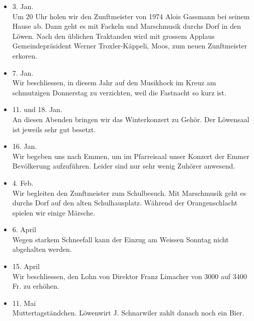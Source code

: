 \begin{multicols}{2}


    \begin{itemize}

        \item[]3. Jan.\\
        Um 20 Uhr holen wir den Zunftmeister von 1974 Alois Gassmann
        bei seinem Hause ab. Dann geht es mit Fackeln und Marschmusik durchs Dorf in den Löwen.
        Nach den üblichen Traktanden wird mit grossem Applaus Gemeindepräsident
        Werner Troxler-Käppeli, Moos, zum neuen Zunftmeister erkoren.

        \item[]7. Jan.\\
        Wir beschliessen, in diesem Jahr auf den Musikhock im Kreuz am schmutzigen Donnerstag zu verzichten,
        weil die Fastnacht so kurz ist.

        \item[]11. und 18. Jan.\\
        An diesen Abenden bringen wir das Winterkonzert zu Gehör. Der Löwensaal ist jeweils sehr gut besetzt.

        \item[]16. Jan.\\
        Wir begeben uns nach Emmen, um im Pfarreisaal unser Konzert der Emmer Bevölkerung aufzuführen.
        Leider sind nur sehr wenig Zuhörer anwesend.

        \item[]4. Feb.\\
        Wir begleiten den Zunftmeister zum Schulbesuch. Mit Marschmusik geht es durchs Dorf auf den alten Schulhausplatz.
        Während der Orangenschlacht spielen wir einige Märsche.

        \item[]6. April\\
        Wegen starkem Schneefall kann der Einzug am Weissen Sonntag nicht abgehalten werden.

        \item[]15. April\\
        Wir beschliessen, den Lohn von Direktor Franz Limacher von 3000 auf 3400 Fr. zu erhöhen.

        \item[]11. Mai\\
        Muttertagständchen. Löwenwirt J. Schnarwiler zahlt danach noch ein Bier.


\end{itemize}
\end{multicols}
